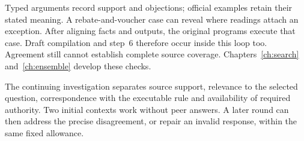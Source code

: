 \documentclass[12pt,a4paper,oneside,openany]{book}
\begin{document}
\begin{MapDiagram}
\end{MapDiagram}

Typed arguments record support and objections; official examples retain their
stated meaning. A rebate-and-voucher case can reveal where readings attach an
exception. After aligning facts and outputs, the original programs execute
that case. Draft compilation and step~6 therefore occur inside this loop too.
Agreement still cannot establish complete source coverage.
Chapters~\ref{ch:search} and~\ref{ch:ensemble} develop these checks.

\clearpage
{}
The continuing investigation separates source support, relevance to the selected
question, correspondence with the executable rule and availability of required
authority. Two initial contexts work without peer answers. A later round can
then address the precise disagreement, or repair an invalid response, within
the same fixed allowance.
\end{document}

